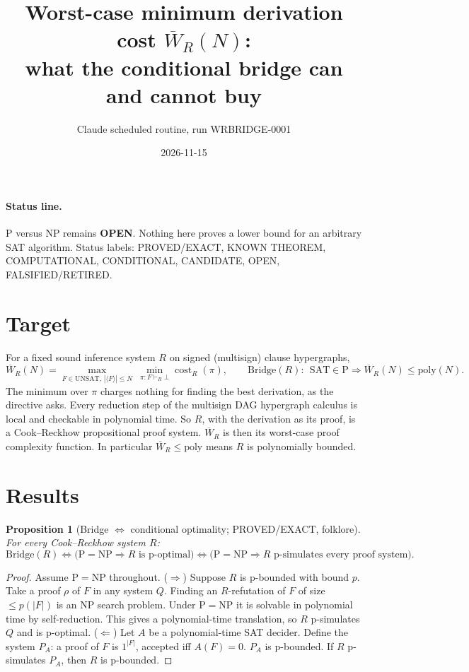 \documentclass[11pt]{article}
\title{Worst-case minimum derivation cost $\overline W_R(N)$:\\ what the conditional bridge can and cannot buy}
\author{Claude scheduled routine, run WRBRIDGE-0001}
\date{2026-11-15}
\newtheorem{proposition}{Proposition}
\theoremstyle{definition}\newtheorem{definition}{Definition}
\begin{document}
\maketitle

\paragraph{Status line.} P versus NP remains \textbf{OPEN}. Nothing here proves a lower bound for an arbitrary SAT algorithm. Status labels: PROVED/EXACT, KNOWN THEOREM, COMPUTATIONAL, CONDITIONAL, CANDIDATE, OPEN, FALSIFIED/RETIRED.

\section{Target}
For a fixed sound inference system $R$ on signed (multisign) clause hypergraphs,
\[
\overline W_R(N)=\max_{F\in\mathrm{UNSAT},\,|\langle F\rangle|\le N}\ \min_{\pi:F\vdash_R\bot}\operatorname{cost}_R(\pi),
\qquad
\text{Bridge}(R):\ \ \mathrm{SAT}\in\mathrm P\Rightarrow \overline W_R(N)\le\mathrm{poly}(N).
\]
The minimum over $\pi$ charges nothing for finding the best derivation, as the directive asks. Every reduction step of the multisign DAG hypergraph calculus is local and checkable in polynomial time. So $R$, with the derivation as its proof, is a Cook--Reckhow propositional proof system. $\overline W_R$ is then its worst-case proof complexity function. In particular $\overline W_R\le\mathrm{poly}$ means $R$ is polynomially bounded.

\section{Results}
\begin{proposition}[Bridge $\Leftrightarrow$ conditional optimality; PROVED/EXACT, folklore]\label{p:eq}
For every Cook--Reckhow system $R$:
\[
\mathrm{Bridge}(R)\iff\bigl(\mathrm P=\mathrm{NP}\Rightarrow R\text{ is p-optimal}\bigr)\iff\bigl(\mathrm P=\mathrm{NP}\Rightarrow R\text{ p-simulates every proof system}\bigr).
\]
\end{proposition}
\begin{proof}
Assume $\mathrm P=\mathrm{NP}$ throughout.
($\Rightarrow$) Suppose $R$ is p-bounded with bound $p$. Take a proof $\rho$ of $F$ in any system $Q$. Finding an $R$-refutation of $F$ of size $\le p(|F|)$ is an NP search problem. Under $\mathrm P=\mathrm{NP}$ it is solvable in polynomial time by self-reduction. This gives a polynomial-time translation, so $R$ p-simulates $Q$ and is p-optimal.
($\Leftarrow$) Let $A$ be a polynomial-time SAT decider. Define the system $P_A$: a proof of $F$ is $1^{|F|}$, accepted iff $A(F)=0$. $P_A$ is p-bounded. If $R$ p-simulates $P_A$, then $R$ is p-bounded.
\end{proof}
\end{document}
